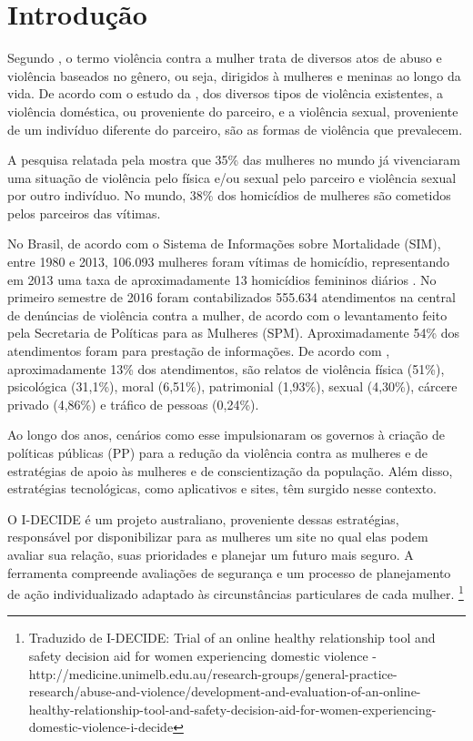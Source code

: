 \chapter[Introdução]{Introdução}

Segundo , o termo violência contra a mulher trata de
diversos atos de abuso e violência baseados no gênero, ou seja, dirigidos à mulheres e meninas ao longo da vida.
De acordo com o estudo da , dos diversos tipos de violência existentes, a violência doméstica, ou proveniente do parceiro,
e a violência sexual, proveniente de um indivíduo diferente do parceiro, são as formas de violência que prevalecem.

A pesquisa relatada pela  mostra que 35\% das mulheres no mundo já vivenciaram uma situação
de violência pelo física e/ou sexual pelo parceiro e violência sexual por outro indivíduo. No mundo, 38\% dos homicídios de mulheres são cometidos pelos parceiros das vítimas.

No Brasil, de acordo com o Sistema de Informações sobre Mortalidade (SIM), entre 1980 e 2013, 106.093 mulheres foram vítimas de homicídio, representando em 2013 uma taxa de aproximadamente 13 homicídios femininos
diários \cite{mapa_violencia_2015}. 
No primeiro semestre de 2016 foram contabilizados 555.634 atendimentos na central de denúncias 
de violência contra a mulher, de acordo com o levantamento feito pela Secretaria de Políticas para as Mulheres (SPM). 
Aproximadamente 54\% dos atendimentos foram para prestação de informações. De acordo com \cite{portal_180}, aproximadamente 13\% dos atendimentos, são relatos de violência física (51\%), psicológica (31,1\%), moral (6,51\%), patrimonial (1,93\%), sexual (4,30\%), cárcere privado (4,86\%) e tráfico de pessoas (0,24\%).

Ao longo dos anos, cenários como esse impulsionaram os governos à criação de políticas públicas (PP) para a redução da violência contra as mulheres e de estratégias de apoio às mulheres e de conscientização da população. Além disso, estratégias tecnológicas, como aplicativos e sites, têm surgido nesse contexto.

O I-DECIDE é um projeto australiano, proveniente dessas estratégias, responsável por disponibilizar para as mulheres um site
no qual elas podem avaliar sua relação, suas prioridades e planejar um futuro mais seguro. A ferramenta compreende avaliações de segurança e um processo de planejamento de ação individualizado adaptado às circunstâncias particulares de cada mulher. \footnote{Traduzido de I-DECIDE: Trial of an online healthy relationship tool and safety decision aid for women experiencing domestic violence - http://medicine.unimelb.edu.au/research-groups/general-practice-research/abuse-and-violence/development-and-evaluation-of-an-online-healthy-relationship-tool-and-safety-decision-aid-for-women-experiencing-domestic-violence-i-decide}


